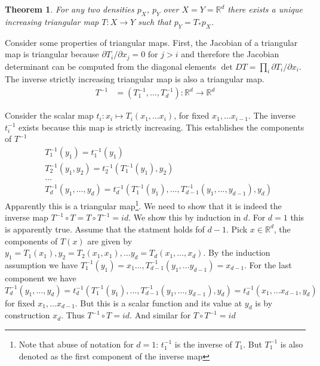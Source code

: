 \documentclass[12pt,a4paper]{article}
\newtheorem{theorem}{Theorem}
\begin{document}
\begin{theorem}{\cite{Bogachev_2005, jaini_polynomial_flow_2019}} \label{thm:bogachev}
	For any two densities $p_X$, $p_Y$ over $X=Y=\mathbb{R}^d$ there exists a unique increasing triangular map $T: X \rightarrow Y$ such that $p_Y = T_*p_X$.
\end{theorem}

Consider some properties of triangular maps.
First, the Jacobian of a triangular map is triangular because $\partial T_i /\partial x_j = 0 \text{ for } j > i$ and therefore the Jacobian determinant can be computed from the diagonal elements $\det DT = \prod_i \partial T_i /\partial x_i$. 
The inverse strictly increasing triangular map is also a triangular map.
\begin{align}
	T^{-1} &= (T^{-1}_1, \dots, T^{-1}_d): \mathbb{R}^d  \rightarrow \mathbb{R}^d \label{eq_inv_triang}
\end{align}

Consider the  scalar map  $t_i :x_i \mapsto T_i(x_1, \dots x_i)$, for fixed $x_1, \dots x_{i-1}$. The inverse $t_i^{-1}$ exists because this map is strictly increasing. This establishes the components of $T^{-1}$
\begin{align}
	&T_1^{-1}(y_1) = t_1^{-1}(y_1) \nonumber \\ 
	&T_2^{-1}(y_1,y_2) = t_2^{-1}(T_1^{-1}(y_1),y_2) \nonumber \\
	&\dots \nonumber \\
	&T_d^{-1}(y_1,\dots, y_d) = t_d^{-1}(T_1^{-1}(y_1), \dots, T_{d-1}^{-1}(y_1, \dots,y_{d-1} ), y_d) \label{eq:inv_triang_rec}
\end{align}
Apparently this is a triangular map\footnote{Note that abuse of notation for $d=1$: $t_1^{-1}$ is the inverse of $T_1$. But $T^{-1}_1$ is also denoted as the first component of the inverse map}. We need to show that it is indeed the inverse map $T^{-1}\circ T = T\circ T^{-1} = id$. We show this by induction in $d$. For $d=1$ this is apparently true. Assume that the statment holds fof $d-1$. Pick $x \in \mathbb R^d$, the components of $T(x)$ are given by $y_1 = T_1(x_1), y_2 = T_2(x_1, x_1), \dots y_d = T_d(x_1, \dots, x_d)$. By the induction assumption
we have $T_1^{-1}(y_1)=x_1 \dots, T_{d-1}^{-1}(y_1, \dots y_{d-1})=x_{d-1}$.  For the last component we have $T_d^{-1}(y_1,\dots, y_d) = t_d^{-1}(T_1^{-1}(y_1), \dots, T_{d-1}^{-1}(y_1, \dots,y_{d-1} ), y_d) = t_d^{-1}(x_1, \dots x_{d-1}, y_d)$ for fixed $x_1, \dots x_{d-1}$.  But this is a scalar function and its value at $y_d$ is by construction $x_d$. Thus $T^{-1}\circ T = id$. And similar for $T\circ T^{-1}=id$
\end{document}
